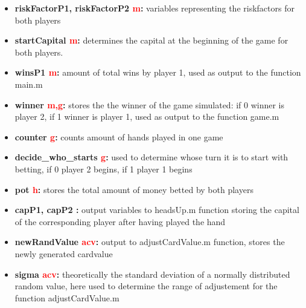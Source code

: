 \documentclass[11pt]{article}
\begin{document}
\begin{itemize}
\item	\textbf{riskFactorP1, riskFactorP2 \textcolor{red}{m}:}  variables representing the riskfactors for both players\\

\item	\textbf{startCapital \textcolor{red}{m}:} determines the capital at the beginning of the game for both players. \\

\item	\textbf{winsP1 \textcolor{red}{m}:} amount of total wins by player 1, used as output to the function main.m  \\

\item	\textbf{winner \textcolor{red}{m,g}:} stores the the winner of the game simulated: if 0 winner is player 2, if 1 winner is player 1, used as output to the function game.m\\

\item	\textbf{counter \textcolor{red}{g}:} counts amount of hands played in one game \\

\item	\textbf{decide\_who\_starts \textcolor{red}{g}:} used to determine whose turn it is to start with betting, if 0 player 2 begins, if 1 player 1 begins  \\

\item	\textbf{pot \textcolor{red}{h}:}  stores the total amount of money betted by both players\\

\item	\textbf{capP1, capP2 \textcolor{red}{}:} output variables to headsUp.m function storing the capital of the corresponding player after having played the hand\\

\item	\textbf{newRandValue \textcolor{red}{acv}:} output to adjustCardValue.m function, stores the newly generated cardvalue  \\

\item	\textbf{sigma \textcolor{red}{acv}:} theoretically the standard deviation of a normally distributed random value, here used to determine the range of adjustement for the function adjustCardValue.m \\

\end{itemize}
\end{document}
